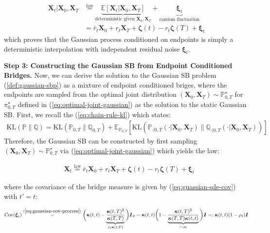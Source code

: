 \documentclass{article}
\begin{document}
\begin{align}
    \boldsymbol{X}_t|\boldsymbol{X}_0, \boldsymbol{X}_T&\overset{\text{law}}{=}\underbrace{\mathbb{E}\left[\boldsymbol{X}_t|\boldsymbol{X}_0, \boldsymbol{X}_T\right]}_{\text{deterministic given }\boldsymbol{X}_0, \boldsymbol{X}_T}+\underbrace{\boldsymbol{\xi}_t}_{\text{random fluctuation}}\nonumber\\
    &=\bar{r}_t\boldsymbol{X}_0+r_t\boldsymbol{X}_T+\boldsymbol{\zeta}(t)-r_t\boldsymbol{\zeta}(T)+\boldsymbol{\xi}_t
\end{align}
which proves that the Gaussian process conditioned on endpoints is simply a deterministic interpolation with independent residual noise $\boldsymbol{\xi}_t$.

\textbf{Step 3: Constructing the Gaussian SB from Endpoint Conditioned Bridges. }
Now, we can derive the solution to the Gaussian SB problem (\ref{def:gaussian-sbp}) as a mixture of endpoint conditioned briges, where the endpoints are sampled from the optimal joint distribution $(\boldsymbol{X}_0, \boldsymbol{X}_T)\sim \mathbb{P}_{0,T}^\star$ for $\pi_{0,T}^\star$ defined in (\ref{eq:optimal-joint-gaussian}) as the solution to the static Gaussian SB. First, we recall the (\ref{eq:chain-rule-kl}) which states:
\begin{align}
    \text{KL}(\mathbb{P}\|\mathbb{Q})=\text{KL}(\mathbb{P}_{0,T}\|\mathbb{Q}_{0,T})+\mathbb{E}_{\mathbb{P}_{0,T}}\left[\text{KL}(\mathbb{P}_{\cdot|0,T}(\cdot|\boldsymbol{X}_0, \boldsymbol{X}_T)\|\mathbb{Q}_{\cdot|0,T}(\cdot|\boldsymbol{X}_0, \boldsymbol{X}_T))\right]
\end{align}
Therefore, the Gaussian SB can be constructed by first sampling $(\boldsymbol{X}_0, \boldsymbol{X}_T)\sim \mathbb{P}_{0,T}^\star$ via (\ref{eq:optimal-joint-gaussian}) which yields the law:
\begin{small}
\begin{align}
    &\boldsymbol{X}_t\overset{\text{law}}{=}\bar{r}_t\boldsymbol{X}_0+r_t\boldsymbol{X}_T+\boldsymbol{\zeta}(t)-r_t\boldsymbol{\zeta}(T)+\boldsymbol{\xi}_t\label{eq:xt-law-gaussian}
\end{align}
\end{small}
where the covariance of the bridge measure is given by (\ref{eq:guassian-sde-cov}) with $t'=t$:
\begin{small}
\begin{align}
    \text{Cov}(\boldsymbol{\xi}_t)\overset{(\ref{eq:gaussian-cov-process})}{=}\bigg(\boldsymbol{\kappa}(t,t)-\underbrace{\frac{\boldsymbol{\kappa}(t,T)^2}{\boldsymbol{\kappa}(T,T)}}_{r_t\boldsymbol{\kappa}(t,T)}\bigg)\boldsymbol{I}_d=\boldsymbol{\kappa}(t,t)\bigg(1-\underbrace{\frac{\boldsymbol{\kappa}(t,T)^2}{\boldsymbol{\kappa}(T,T)\boldsymbol{\kappa}(t,t)}}_{=:\rho_t}\bigg)\boldsymbol{I}=:\boldsymbol{\kappa}(t,t)(1-\rho_t)\boldsymbol{I}\label{eq:cov-noise-gaussian}
\end{align}
\end{small}
\end{document}
